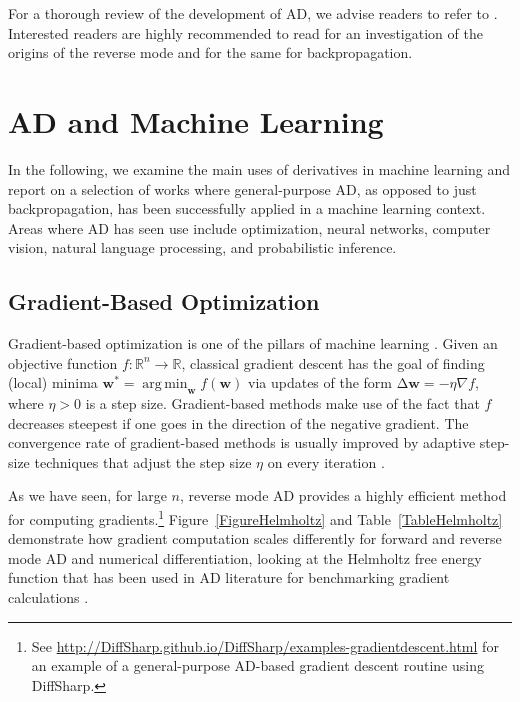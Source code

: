\documentclass[twoside,11pt]{article}
\DeclareMathOperator*{\argmin}{arg\,min}
\newcommand{\Del}{\mathrm{\Delta}}
\begin{document}
For a thorough review of the development of AD, we advise readers to refer to \citet{Rall2006}. Interested readers are highly recommended to read \citet{Griewank2012} for an investigation of the origins of the reverse mode and \citet{schmidhuber2015deep} for the same for backpropagation.

\section{AD and Machine Learning}
\label{SectionDerivativesAndMachineLearning}

In the following, we examine the main uses of derivatives in machine learning and report on a selection of works where general-purpose AD, as opposed to just backpropagation, has been successfully applied in a machine learning context. Areas where AD has seen use include optimization, neural networks, computer vision, natural language processing, and probabilistic inference.

\subsection{Gradient-Based Optimization}

Gradient-based optimization is one of the pillars of machine learning \citep{bottou2016optimization}. Given an objective function $f: \mathbb{R}^n \to \mathbb{R}$, classical gradient descent has the goal of finding (local) minima $\mathbf{w}^* = \argmin_{\mathbf{w}} f(\mathbf{w})$ via updates of the form $\Del \mathbf{w} = -\eta \nabla f$, where $\eta>0$ is a step size. Gradient-based methods make use of the fact that $f$ decreases steepest if one goes in the direction of the negative gradient. The convergence rate of gradient-based methods is usually improved by adaptive step-size techniques that adjust the step size $\eta$ on every iteration \citep{duchi2011adaptive,schaul2013no,kingma2015adam}.

As we have seen, for large $n$, reverse mode AD provides a highly efficient method for computing gradients.\footnote{See \url{http://DiffSharp.github.io/DiffSharp/examples-gradientdescent.html} for an example of a general-purpose AD-based gradient descent routine using DiffSharp.} Figure~\ref{FigureHelmholtz} and Table~\ref{TableHelmholtz} demonstrate how gradient computation scales differently for forward and reverse mode AD and numerical differentiation, looking at the Helmholtz free energy function that has been used in AD literature for benchmarking gradient calculations \citep{Griewank1989,Griewank2008,griewank2012numerical}.
\end{document}
